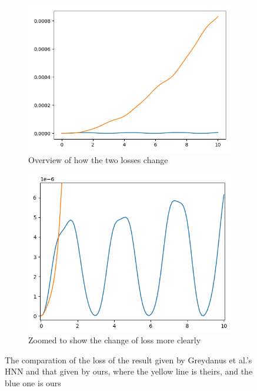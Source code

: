 \documentclass{article}
\begin{document}
\begin{figure}[h]
	\centering
	\begin{subfigure}[b]{0.45\linewidth}
		\includegraphics[width=\linewidth]{loss_comp.png}
		\caption{Overview of how the two losses change}
	\end{subfigure}
	\begin{subfigure}[b]{0.45\linewidth}
		\includegraphics[width=\linewidth]{loss_comp2.png}
		\caption{Zoomed to show the change of loss more clearly}
	\end{subfigure}
	\caption{The comparation of the loss of the result given by Greydanus et al.'s HNN and that given by ours, where the yellow line is theirs, and the blue one is ours}
	\label{fig:loss_comp}
\end{figure}
\end{document}

